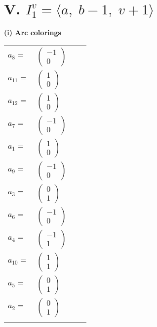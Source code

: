 \documentclass[1p]{elsarticle_modified}
\theoremstyle{definition}
\begin{document}
\centering \section*{V. $I^v_{1}= \langle a,\;b-1,\;v+1 \rangle$}
\flushleft \textbf{(i) Arc colorings}\\
\begin{tabular}{m{7pt} m{180pt} m{7pt} m{180pt} }
\flushright $a_{8}=$&$\begin{pmatrix}-1\\0\end{pmatrix}$ \\
\flushright $a_{11}=$&$\begin{pmatrix}1\\0\end{pmatrix}$ \\
\flushright $a_{12}=$&$\begin{pmatrix}1\\0\end{pmatrix}$ \\
\flushright $a_{7}=$&$\begin{pmatrix}-1\\0\end{pmatrix}$ \\
\flushright $a_{1}=$&$\begin{pmatrix}1\\0\end{pmatrix}$ \\
\flushright $a_{9}=$&$\begin{pmatrix}-1\\0\end{pmatrix}$ \\
\flushright $a_{3}=$&$\begin{pmatrix}0\\1\end{pmatrix}$ \\
\flushright $a_{6}=$&$\begin{pmatrix}-1\\0\end{pmatrix}$ \\
\flushright $a_{4}=$&$\begin{pmatrix}-1\\1\end{pmatrix}$ \\
\flushright $a_{10}=$&$\begin{pmatrix}1\\1\end{pmatrix}$ \\
\flushright $a_{5}=$&$\begin{pmatrix}0\\1\end{pmatrix}$ \\
\flushright $a_{2}=$&$\begin{pmatrix}0\\1\end{pmatrix}$\\&\end{tabular}
\end{document}
